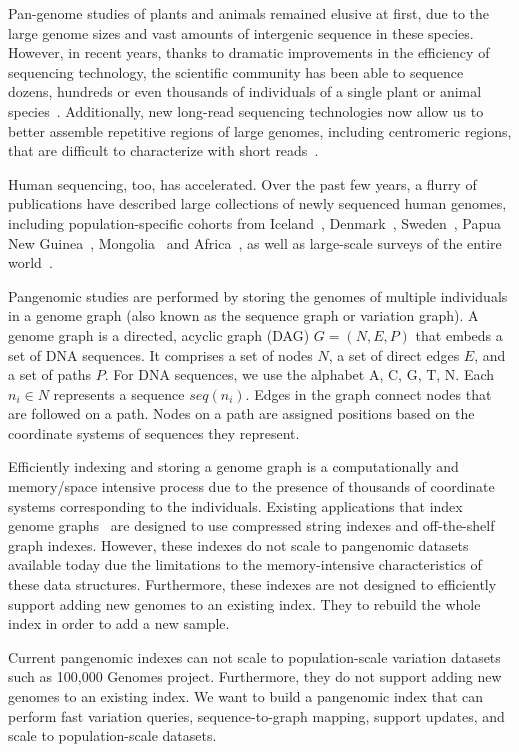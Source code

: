 Pan-genome studies of plants and animals remained elusive at first, due to the large genome sizes and vast amounts of intergenic sequence in these species. However, in recent years, thanks to dramatic improvements in the efficiency of sequencing technology, the scientific community has been able to sequence dozens, hundreds or even thousands of individuals of a single plant or animal species~\cite{XXX}. Additionally, new long-read sequencing technologies now allow us to better assemble repetitive regions of large genomes, including centromeric regions, that are difficult to characterize with short reads~\cite{XXX}.

Human sequencing, too, has accelerated. Over the past few years, a flurry of publications have described large collections of newly sequenced human genomes, including population-specific cohorts from Iceland~\cite{XXX}, Denmark~\cite{XXX}, Sweden~\cite{XXX}, Papua New Guinea~\cite{XXX}, Mongolia~\cite{XXX} and Africa~\cite{XXX}, as well as large-scale surveys of the entire world~\cite{XXX}. 

Pangenomic studies are performed by storing the genomes of multiple individuals in a genome graph (also known as the sequence graph or variation graph). A genome graph is a directed, acyclic graph (DAG) $G = (N, E, P)$ that embeds a set of DNA sequences. It comprises a set of
nodes $N$, a set of direct edges $E$, and a set of paths $P$. For DNA sequences, we use the
alphabet {A, C, G, T, N}. Each $n_i \in N$ represents a sequence $seq(n_i)$. Edges in the graph connect nodes that are followed on a path. Nodes on a path
are assigned positions based on the coordinate systems of sequences they represent.

Efficiently indexing and storing a genome graph is a computationally and memory/space intensive process due to the presence of thousands of coordinate systems corresponding to the individuals. Existing applications that index genome graphs~\cite{pandey2021variantstore,garrison2018variation} are designed to use compressed string indexes and off-the-shelf graph indexes. However, these indexes do not scale to pangenomic datasets available today due the limitations to the memory-intensive characteristics of these data structures. Furthermore, these indexes are not designed to efficiently support adding new genomes to an existing index. They to rebuild the whole index in order to add a new sample.



\begin{rproblem}
Current pangenomic indexes can not scale to population-scale variation datasets such as 100,000 Genomes project. Furthermore, they do not support adding new genomes to an existing index. We want to build a pangenomic index that can perform fast variation queries, sequence-to-graph mapping, support updates, and scale to population-scale datasets.
\label{rprob:peppermint}
\end{rproblem}

